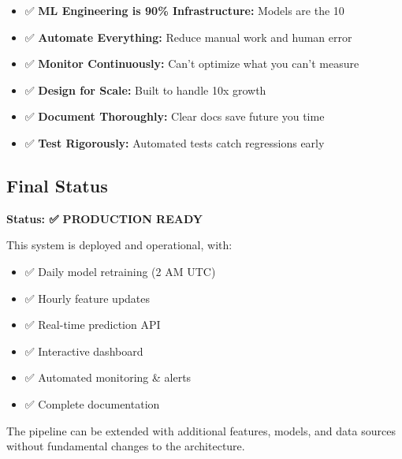 \begin{itemize}
    \item ✅ \textbf{ML Engineering is 90\% Infrastructure:} Models are the 10%
    \item ✅ \textbf{Automate Everything:} Reduce manual work and human error
    \item ✅ \textbf{Monitor Continuously:} Can't optimize what you can't measure
    \item ✅ \textbf{Design for Scale:} Built to handle 10x growth
    \item ✅ \textbf{Document Thoroughly:} Clear docs save future you time
    \item ✅ \textbf{Test Rigorously:} Automated tests catch regressions early
\end{itemize}

\subsection{Final Status}

\textbf{Status: ✅ PRODUCTION READY}

This system is deployed and operational, with:
\begin{itemize}
    \item ✅ Daily model retraining (2 AM UTC)
    \item ✅ Hourly feature updates
    \item ✅ Real-time prediction API
    \item ✅ Interactive dashboard
    \item ✅ Automated monitoring \& alerts
    \item ✅ Complete documentation
\end{itemize}

The pipeline can be extended with additional features, models, and data sources without fundamental changes to the architecture.



